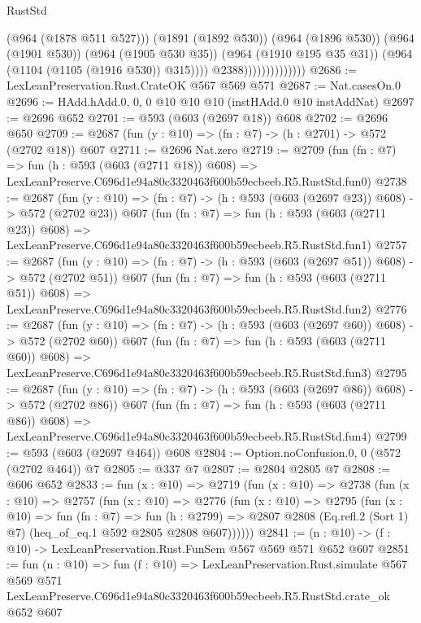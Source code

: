 \begin{lexlean}{RustStd}
\begin{coremodule}
                                      (@964 (@1878 @511 @527)))
                                    (@1891 (@1892 @530))
                                    (@964 (@1896 @530))
                                    (@964 (@1901 @530))
                                    (@964 (@1905 @530 @35))
                                    (@964 (@1910 @195 @35 @31))
                                    (@964 (@1104 (@1105 (@1916 @530)) @315))))
                                @2388))))))))))))))
@2686 := LexLeanPreservation.Rust.CrateOK @567 @569 @571
@2687 := Nat.casesOn.{0}
@2696 := HAdd.hAdd.{0, 0, 0} @10 @10 @10 (instHAdd.{0} @10 instAddNat)
@2697 := @2696 @652
@2701 := @593 (@603 (@2697 @18)) @608
@2702 := @2696 @650
@2709 := @2687 (fun (y : @10) => (fn : @7) -> (h : @2701) -> @572 (@2702 @18)) @607
@2711 := @2696 Nat.zero
@2719 := @2709
    (fun (fn : @7) =>
    fun (h : @593 (@603 (@2711 @18)) @608) =>
    LexLeanPreserve.C696d1e94a80c3320463f600b59ecbeeb.R5.RustStd.fun0)
@2738 := @2687
    (fun (y : @10) => (fn : @7) -> (h : @593 (@603 (@2697 @23)) @608) -> @572 (@2702 @23))
    @607
    (fun (fn : @7) =>
    fun (h : @593 (@603 (@2711 @23)) @608) =>
    LexLeanPreserve.C696d1e94a80c3320463f600b59ecbeeb.R5.RustStd.fun1)
@2757 := @2687
    (fun (y : @10) => (fn : @7) -> (h : @593 (@603 (@2697 @51)) @608) -> @572 (@2702 @51))
    @607
    (fun (fn : @7) =>
    fun (h : @593 (@603 (@2711 @51)) @608) =>
    LexLeanPreserve.C696d1e94a80c3320463f600b59ecbeeb.R5.RustStd.fun2)
@2776 := @2687
    (fun (y : @10) => (fn : @7) -> (h : @593 (@603 (@2697 @60)) @608) -> @572 (@2702 @60))
    @607
    (fun (fn : @7) =>
    fun (h : @593 (@603 (@2711 @60)) @608) =>
    LexLeanPreserve.C696d1e94a80c3320463f600b59ecbeeb.R5.RustStd.fun3)
@2795 := @2687
    (fun (y : @10) => (fn : @7) -> (h : @593 (@603 (@2697 @86)) @608) -> @572 (@2702 @86))
    @607
    (fun (fn : @7) =>
    fun (h : @593 (@603 (@2711 @86)) @608) =>
    LexLeanPreserve.C696d1e94a80c3320463f600b59ecbeeb.R5.RustStd.fun4)
@2799 := @593 (@603 (@2697 @464)) @608
@2804 := Option.noConfusion.{0, 0} (@572 (@2702 @464)) @7
@2805 := @337 @7
@2807 := @2804 @2805 @7
@2808 := @606 @652
@2833 := fun (x : @10) =>
  @2719
    (fun (x : @10) =>
    @2738
      (fun (x : @10) =>
      @2757
        (fun (x : @10) =>
        @2776
          (fun (x : @10) =>
          @2795
            (fun (x : @10) =>
            fun (fn : @7) =>
            fun (h : @2799) =>
            @2807 @2808 (Eq.refl.{2} (Sort 1) @7) (heq_of_eq.{1} @592 @2805 @2808 @607))))))
@2841 := (n : @10) -> (f : @10) -> LexLeanPreservation.Rust.FunSem @567 @569 @571 @652 @607
@2851 := fun (n : @10) =>
  fun (f : @10) =>
  LexLeanPreservation.Rust.simulate
    @567
    @569
    @571
    LexLeanPreserve.C696d1e94a80c3320463f600b59ecbeeb.R5.RustStd.crate_ok
    @652
    @607
\end{coremodule}
\end{lexlean}
